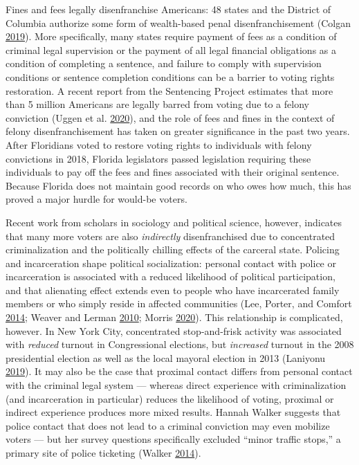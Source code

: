 \documentclass[
  12pt,
]{article}
\begin{document}
Fines and fees legally disenfranchise Americans: 48 states and the District of Columbia authorize some form of wealth-based penal disenfranchisement (Colgan \protect\hyperlink{ref-Colgan2019}{2019}). More specifically, many states require payment of fees as a condition of criminal legal supervision or the payment of all legal financial obligations as a condition of completing a sentence, and failure to comply with supervision conditions or sentence completion conditions can be a barrier to voting rights restoration. A recent report from the Sentencing Project estimates that more than 5 million Americans are legally barred from voting due to a felony conviction (Uggen et al. \protect\hyperlink{ref-Uggen2020}{2020}), and the role of fees and fines in the context of felony disenfranchisement has taken on greater significance in the past two years. After Floridians voted to restore voting rights to individuals with felony convictions in 2018, Florida legislators passed legislation requiring these individuals to pay off the fees and fines associated with their original sentence. Because Florida does not maintain good records on who owes how much, this has proved a major hurdle for would-be voters.

Recent work from scholars in sociology and political science, however, indicates that many more voters are also \emph{indirectly} disenfranchised due to concentrated criminalization and the politically chilling effects of the carceral state. Policing and incarceration shape political socialization: personal contact with police or incarceration is associated with a reduced likelihood of political participation, and that alienating effect extends even to people who have incarcerated family members or who simply reside in affected communities (Lee, Porter, and Comfort \protect\hyperlink{ref-Lee2014}{2014}; Weaver and Lerman \protect\hyperlink{ref-Weaver2010}{2010}; Morris \protect\hyperlink{ref-Morris2020}{2020}). This relationship is complicated, however. In New York City, concentrated stop-and-frisk activity was associated with \emph{reduced} turnout in Congressional elections, but \emph{increased} turnout in the 2008 presidential election as well as the local mayoral election in 2013 (Laniyonu \protect\hyperlink{ref-Laniyonu2019}{2019}). It may also be the case that proximal contact differs from personal contact with the criminal legal system --- whereas direct experience with criminalization (and incarceration in particular) reduces the likelihood of voting, proximal or indirect experience produces more mixed results. Hannah Walker suggests that police contact that does not lead to a criminal conviction may even mobilize voters --- but her survey questions specifically excluded ``minor traffic stops,'' a primary site of police ticketing (Walker \protect\hyperlink{ref-Walker2014}{2014}).
\end{document}
